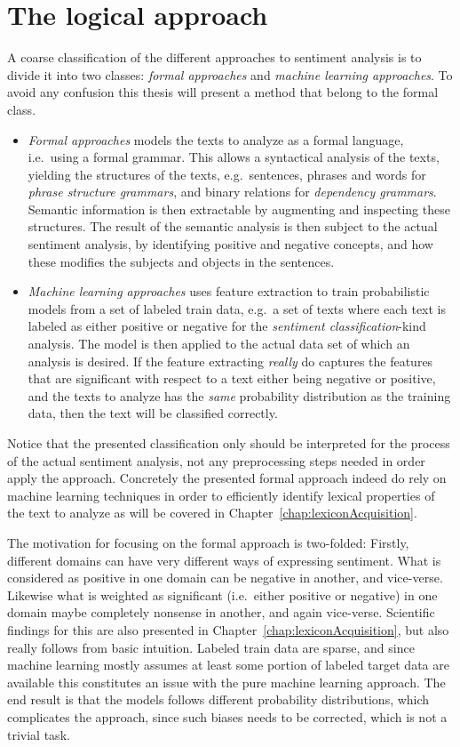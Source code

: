 \section{The logical approach}
A coarse classification of the different approaches to sentiment analysis is to divide it into two classes: \emph{formal approaches} and \emph{machine learning approaches}. To avoid any confusion this thesis will present a method that belong to the formal class. 
\begin{itemize}
	\item \textit{Formal approaches} models the texts to analyze as a formal language, i.e.\ using a formal grammar. This allows a syntactical analysis of the texts, yielding the structures of the texts, e.g.\ sentences, phrases and words for \emph{phrase structure grammars}, and binary relations for \emph{dependency grammars}. Semantic information is then extractable by augmenting and inspecting these structures. The result of the semantic analysis is then subject to the actual sentiment analysis, by identifying positive and negative concepts, and how these modifies the subjects and objects in the sentences.

	\item \textit{Machine learning approaches} uses feature extraction to train probabilistic models from a set of labeled train data, e.g.\ a set of texts where each text is labeled as either positive or negative for the \emph{sentiment classification}-kind analysis. The model is then applied to the actual data set of which an analysis is desired. If the feature extracting \emph{really} do captures the features that are significant with respect to a text either being negative or positive, and the texts to analyze has the \emph{same} probability distribution as the training data, then the text will be classified correctly.
\end{itemize}

Notice that the presented classification only should be interpreted for the process of the actual sentiment analysis, not any preprocessing steps needed in order apply the approach. Concretely the presented formal approach indeed do rely on machine learning techniques in order to efficiently identify lexical properties of the text to analyze as will be covered in Chapter~\ref{chap:lexiconAcquisition}.

The motivation for focusing on the formal approach is two-folded: Firstly, different domains can have very different ways of expressing sentiment. What is considered as positive in one domain can be negative in another, and vice-verse. Likewise what is weighted as significant (i.e.\ either positive or negative) in one domain maybe completely nonsense in another, and again vice-verse. Scientific findings for this are also presented in Chapter~\ref{chap:lexiconAcquisition}, but also really follows from basic intuition. Labeled train data are sparse, and since machine learning mostly assumes at least some portion of labeled target data are available this constitutes an issue with the pure machine learning approach. The end result is that the models follows different probability distributions, which complicates the approach, since such biases needs to be corrected, which is not a trivial task.


